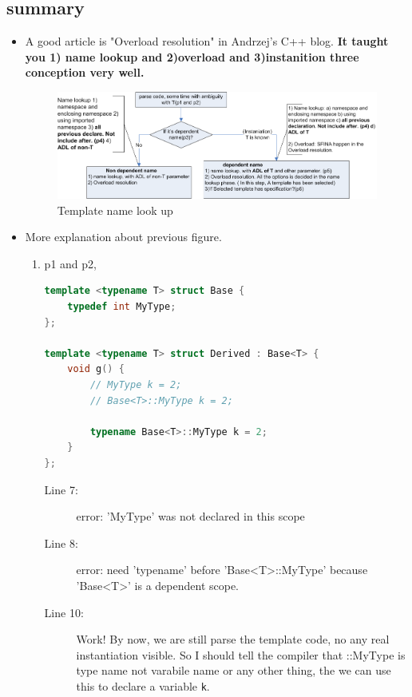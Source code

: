 \documentclass[a4paper,11pt,twoside]{book}
\begin{document}
\subsection{summary}
\begin{itemize}
\item A good article is "Overload resolution" in Andrzej's C++ blog. \textbf{It taught you 1) name lookup and 2)overload and 3)instanition three conception very well.}


\begin{figure}[ht]
	\centering 
	\includegraphics[width=0.8\linewidth]{pics/template.png}
	\caption{Template name look up}
	\label{fig:command}
\end{figure}

\item More explanation about previous figure.

\begin{enumerate}
\item p1 and p2, 
\begin{lstlisting}[frame=single, language=c++]
template <typename T> struct Base {
	typedef int MyType;
};

template <typename T> struct Derived : Base<T> {
	void g() {
		// MyType k = 2;
		// Base<T>::MyType k = 2;
		
		typename Base<T>::MyType k = 2;
	}
};
\end{lstlisting}
\begin{description}
	\item[Line 7:]  error: 'MyType' was not declared in this scope
	
	\item[Line 8:] error: need 'typename' before 'Base<T>::MyType' because 'Base<T>' is a dependent scope.
	
	\item[Line 10:] Work! By now, we are still parse the template code, no any real instantiation visible. So I should tell the compiler that ::MyType is type name not varabile name or any other thing, the we can use this to declare a variable \texttt{k}.
\end{description}


\end{enumerate}
\end{itemize}
\end{document}
